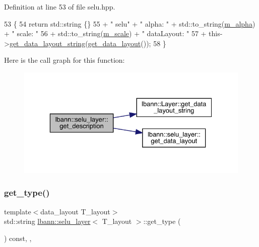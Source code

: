 Definition at line 53 of file selu.\+hpp.


\begin{DoxyCode}
53                                              \{
54     \textcolor{keywordflow}{return} std::string \{\}
55       + \textcolor{stringliteral}{" selu"} + \textcolor{stringliteral}{" alpha: "} + std::to\_string(\hyperlink{classlbann_1_1selu__layer_a72b22e92f3e70f6b996329e5b170554e}{m\_alpha}) + \textcolor{stringliteral}{" scale: "}
56       + std::to\_string(\hyperlink{classlbann_1_1selu__layer_a9575be8104b1b24232a2d167405e693a}{m\_scale}) + \textcolor{stringliteral}{" dataLayout: "}
57       + this->\hyperlink{classlbann_1_1Layer_ae3f4a5602df821f4221614b1e3782dc1}{get\_data\_layout\_string}(\hyperlink{classlbann_1_1selu__layer_a02a03e8f426406619e48258f71feffd1}{get\_data\_layout}());
58   \}
\end{DoxyCode}
Here is the call graph for this function\+:\nopagebreak
\begin{figure}[H]
\begin{center}
\leavevmode
\includegraphics[width=329pt]{classlbann_1_1selu__layer_a58e12f4297b2563718417d4acadea010_cgraph}
\end{center}
\end{figure}
\mbox{\label{classlbann_1_1selu__layer_a5c1cec500adb135bac681610d53dee79}} 
\subsubsection{\texorpdfstring{get\+\_\+type()}{get\_type()}}
{\footnotesize\ttfamily template$<$data\+\_\+layout T\+\_\+layout$>$ \\
std\+::string \hyperlink{classlbann_1_1selu__layer}{lbann\+::selu\+\_\+layer}$<$ T\+\_\+layout $>$\+::get\+\_\+type (\begin{DoxyParamCaption}{ }\end{DoxyParamCaption}) const\hspace{0.3cm}{\ttfamily [inline]}, {\ttfamily [override]}, {\ttfamily [virtual]}}

